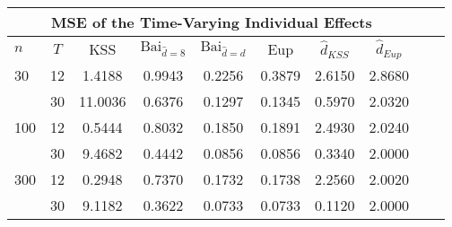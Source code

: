 \begin{tabular}{lccccccccc} 
\hline \multicolumn{8}{c}{MSE of the Time-Varying Individual Effects} \\ \hline 
$n$ & $T$ & KSS & $ \text{Bai}_{\hat{d} = 8}$ & $\text{Bai}_{\hat{d} = d}$ & Eup & $\hat{d}_{KSS}$ & $\hat{d}_{Eup}$ \\
\hline
30 & 12 &  1.4188  &  0.9943  &  0.2256  &  0.3879  &  2.6150  &  2.8680  \\
& 30 &  11.0036  &  0.6376  &  0.1297  &  0.1345  &  0.5970  &  2.0320  \\
100 & 12 &  0.5444  &  0.8032  &  0.1850  &  0.1891  &  2.4930  &  2.0240  \\
& 30 &  9.4682  &  0.4442  &  0.0856  &  0.0856  &  0.3340  &  2.0000  \\
300 & 12 &  0.2948  &  0.7370  &  0.1732  &  0.1738  &  2.2560  &  2.0020  \\
& 30 &  9.1182  &  0.3622  &  0.0733  &  0.0733  &  0.1120  &  2.0000  \\
\end{tabular} 
